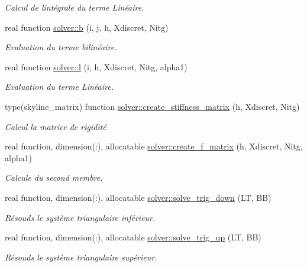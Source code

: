 \begin{DoxyCompactItemize}
\begin{DoxyCompactList}\small\item\em Calcul de l\textquotesingle{}intégrale du terme Linéaire. \end{DoxyCompactList}\item 
real function \hyperlink{namespacesolver_a99565d1c8ed5142211b78fe3ccca060b}{solver\+::b} (i, j, h, Xdiscret, Nitg)
\begin{DoxyCompactList}\small\item\em Evaluation du terme bilinéaire. \end{DoxyCompactList}\item 
real function \hyperlink{namespacesolver_a327c990a10263590618db7a31c4edcc9}{solver\+::l} (i, h, Xdiscret, Nitg, alpha1)
\begin{DoxyCompactList}\small\item\em Evaluation du terme Linéaire. \end{DoxyCompactList}\item 
type(skyline\+\_\+matrix) function \hyperlink{namespacesolver_aefd2f88bd66b9d9ccce170259a49c77d}{solver\+::create\+\_\+stiffness\+\_\+matrix} (h, Xdiscret, Nitg)
\begin{DoxyCompactList}\small\item\em Calcul la matrice de rigidité \end{DoxyCompactList}\item 
real function, dimension(\+:), allocatable \hyperlink{namespacesolver_af45a5f246a818112e6a257335c2b829d}{solver\+::create\+\_\+f\+\_\+matrix} (h, Xdiscret, Nitg, alpha1)
\begin{DoxyCompactList}\small\item\em Calcule du second membre. \end{DoxyCompactList}\item 
real function, dimension(\+:), allocatable \hyperlink{namespacesolver_ad8b8ef6c982475b3fb276f93660b750f}{solver\+::solve\+\_\+trig\+\_\+down} (LT, BB)
\begin{DoxyCompactList}\small\item\em Résouds le système triangulaire inférieur. \end{DoxyCompactList}\item 
real function, dimension(\+:), allocatable \hyperlink{namespacesolver_a08b8f70c86d7bf39b32ce8fdcc872fd4}{solver\+::solve\+\_\+trig\+\_\+up} (LT, BB)
\begin{DoxyCompactList}\small\item\em Résouds le système triangulaire supérieur. \end{DoxyCompactList}\item 

\end{DoxyCompactItemize}
